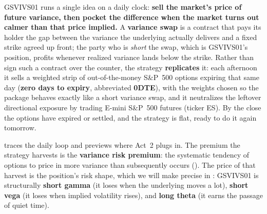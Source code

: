 GSVIVS01 runs a single idea on a daily clock: \textbf{sell the market's price of future variance, then pocket the difference when the market turns out calmer than that price implied.} A \textbf{variance swap} is a contract that pays its holder the gap between the variance the underlying actually delivers and a fixed strike agreed up front; the party who is \emph{short} the swap, which is GSVIVS01's position, profits whenever realized variance lands below the strike. Rather than sign such a contract over the counter, the strategy \textbf{replicates} it: each afternoon it sells a weighted strip of out-of-the-money S\&P~500 options expiring that same day (\textbf{zero days to expiry}, abbreviated \textbf{0DTE}), with the weights chosen so the package behaves exactly like a short variance swap, and it neutralizes the leftover directional exposure by trading E-mini S\&P~500 futures (ticker ES). By the close the options have expired or settled, and the strategy is flat, ready to do it again tomorrow.

 traces the daily loop and previews where Act~2 plugs in. The premium the strategy harvests is the \textbf{variance risk premium}: the systematic tendency of options to price in more variance than subsequently occurs (). The price of that harvest is the position's risk shape, which we will make precise in : GSVIVS01 is structurally \textbf{short gamma} (it loses when the underlying moves a lot), \textbf{short vega} (it loses when implied volatility rises), and \textbf{long theta} (it earns the passage of quiet time).

